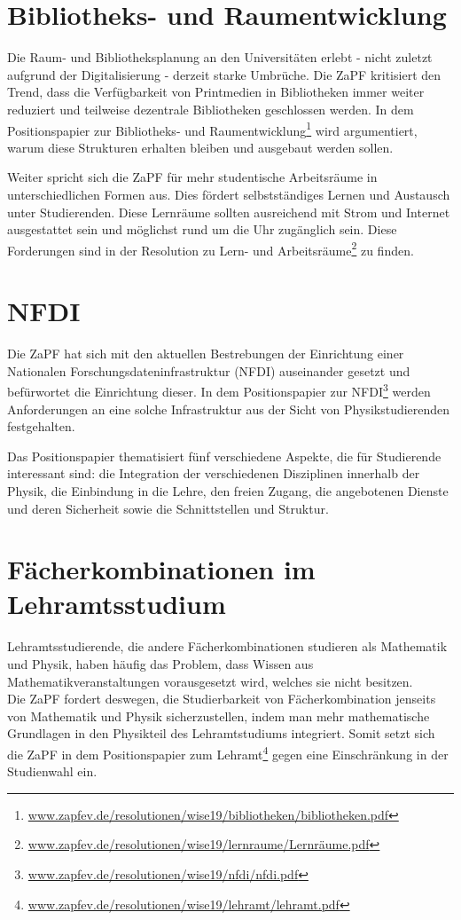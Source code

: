 \section*{Bibliotheks- und Raumentwicklung}
Die Raum- und Bibliotheksplanung an den Universitäten erlebt - nicht zuletzt aufgrund der Digitalisierung - derzeit starke Umbrüche. Die ZaPF kritisiert den Trend, dass die Verfügbarkeit von Printmedien in Bibliotheken immer weiter reduziert und teilweise dezentrale Bibliotheken geschlossen werden. In dem Positionspapier zur Bibliotheks- und Raumentwicklung\footnote{\url{www.zapfev.de/resolutionen/wise19/bibliotheken/bibliotheken.pdf}} wird argumentiert, warum diese Strukturen erhalten bleiben und ausgebaut werden sollen.

Weiter spricht sich die ZaPF für mehr studentische Arbeitsräume in unterschiedlichen Formen aus. Dies fördert selbstständiges Lernen und Austausch unter Studierenden. Diese Lernräume sollten ausreichend mit Strom und Internet ausgestattet sein und möglichst rund um die Uhr zugänglich sein. Diese Forderungen sind in der Resolution zu Lern- und Arbeitsräume\footnote{\url{www.zapfev.de/resolutionen/wise19/lernraume/Lernräume.pdf}} zu finden.

\section*{NFDI}
Die ZaPF hat sich mit den aktuellen Bestrebungen der Einrichtung einer Nationalen Forschungsdateninfrastruktur (NFDI) auseinander gesetzt und befürwortet die Einrichtung dieser. In dem Positionspapier zur NFDI\footnote{\url{www.zapfev.de/resolutionen/wise19/nfdi/nfdi.pdf}} werden Anforderungen an eine solche Infrastruktur aus der Sicht von Physikstudierenden festgehalten.

Das Positionspapier thematisiert fünf verschiedene Aspekte, die für Studierende interessant sind: die Integration der verschiedenen Disziplinen innerhalb der Physik, die Einbindung in die Lehre, den freien Zugang, die angebotenen Dienste und deren Sicherheit sowie die Schnittstellen und Struktur.

\section*{Fächerkombinationen im Lehramtsstudium}
Lehramtsstudierende, die andere Fächerkombinationen studieren als Mathematik und Physik, haben häufig das Problem, dass Wissen aus Mathematikveranstaltungen vorausgesetzt wird, welches sie nicht besitzen.\\
Die ZaPF fordert deswegen, die Studierbarkeit von Fächerkombination jenseits von Mathematik und Physik sicherzustellen, indem man mehr mathematische Grundlagen in den Physikteil des Lehramtstudiums integriert. Somit setzt sich die ZaPF in dem Positionspapier zum Lehramt\footnote{\url{www.zapfev.de/resolutionen/wise19/lehramt/lehramt.pdf}} gegen eine Einschränkung in der Studienwahl ein.

